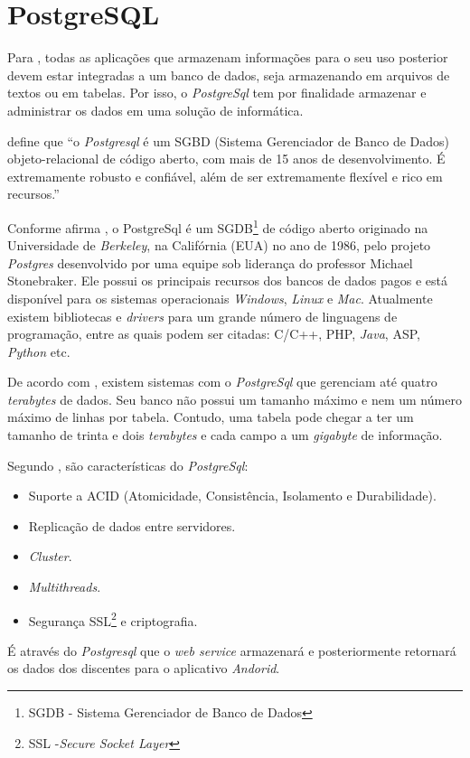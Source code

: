 \section{PostgreSQL}

	\par Para , todas as aplicações que armazenam
informações para o seu uso posterior devem estar integradas a um banco de
dados, seja armazenando em arquivos de textos ou em tabelas. Por isso, o
\textit{PostgreSql} tem por finalidade armazenar e administrar os dados em uma
solução de informática.
	
	\par {} define que “o \textit{Postgresql} é
um SGBD (Sistema Gerenciador de Banco de Dados) objeto-relacional de código
aberto, com mais de 15 anos de desenvolvimento. É extremamente robusto e
confiável, além de ser extremamente flexível e rico em recursos.” 

	\par Conforme afirma , o PostgreSql é um
SGDB\footnote{SGDB - Sistema Gerenciador de Banco de Dados } de código aberto
originado na Universidade de \textit{Berkeley}, na Califórnia (EUA) no ano de
1986, pelo projeto \textit{Postgres} desenvolvido por uma equipe sob liderança
do professor Michael Stonebraker. Ele possui os principais recursos dos bancos
de dados pagos e está disponível para os sistemas operacionais
\textit{Windows}, \textit{Linux} e \textit{Mac}. Atualmente existem bibliotecas
e \textit{drivers} para um grande número de linguagens de programação, entre as
quais podem ser citadas: C/C++, PHP, \textit{Java}, ASP, \textit{Python} etc.

	\par De acordo com , existem sistemas com o
\textit{PostgreSql} que gerenciam até quatro \textit{terabytes} de dados. Seu
banco não possui um tamanho máximo e nem um número máximo de linhas por tabela.
Contudo, uma tabela pode chegar a ter um tamanho de trinta e dois
\textit{terabytes} e cada campo a um \textit{gigabyte} de informação.

	\par Segundo , são características do
\textit{PostgreSql}:

	\begin{itemize}
	  
	  \item Suporte a ACID (Atomicidade, Consistência, Isolamento e Durabilidade). 
	  
	  \item Replicação de dados entre servidores.
	  
	  \item \textit{Cluster}.
	  
	  \item \textit{Multithreads}.
	  
	  \item Segurança SSL\footnote{SSL -\textit{Secure Socket Layer}} e
	  criptografia.
	    
	\end{itemize}

	\par É através do \textit{Postgresql} que o \textit{web service} armazenará e
posteriormente retornará os dados dos discentes para o aplicativo
\textit{Andorid}.
